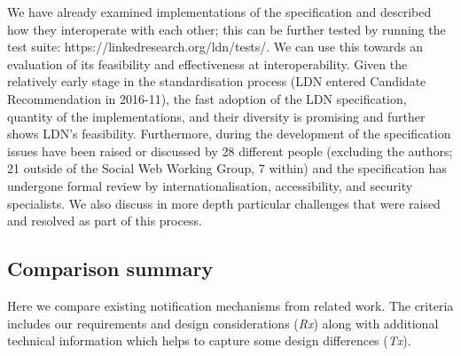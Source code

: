 \documentclass[a4paper]{llncs}
\begin{document}
\par We have already examined \empty implementations of the specification and described how they interoperate with each other; this can be further tested by running the \empty test suite: https://linkedresearch.org/ldn/tests/. We can use this towards an evaluation of its feasibility and effectiveness at interoperability. Given the relatively early stage in the standardisation process (LDN entered Candidate Recommendation in 2016-11), the fast adoption of the LDN specification, quantity of the implementations, and their diversity is promising and further shows LDN’s feasibility. Furthermore, during the development of the specification issues have been raised or discussed by 28 different people (excluding the authors; 21 outside of the Social Web Working Group, 7 within) and the specification has undergone formal review by internationalisation, accessibility, and security specialists. We also discuss in more depth particular challenges that were raised and resolved as part of this process.


                                \subsection{Comparison summary}
  \label{comparison-summary}



\par Here we compare existing notification mechanisms from related work. The criteria includes our \empty requirements and design considerations ({\em Rx}) along with additional technical information which helps to capture some design differences ({\em Tx}).
\end{document}
